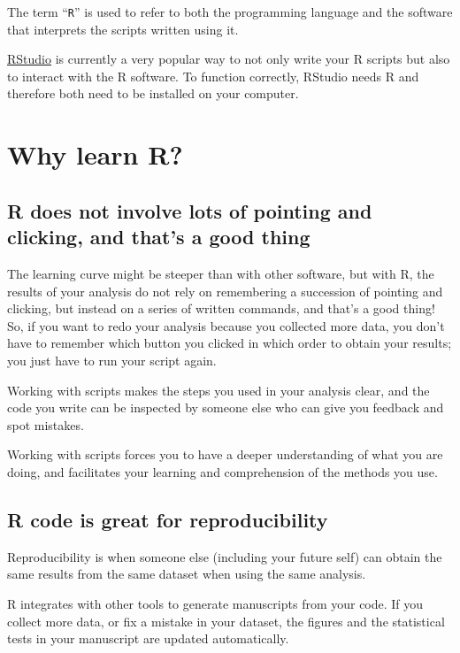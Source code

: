\documentclass[]{book}
\begin{document}
The term ``\texttt{R}'' is used to refer to both the programming
language and the software that interprets the scripts written using it.

\href{https://rstudio.com}{RStudio} is currently a very popular way to
not only write your R scripts but also to interact with the R software.
To function correctly, RStudio needs R and therefore both need to be
installed on your computer.

\section{Why learn R?}\label{why-learn-r}

\subsection{R does not involve lots of pointing and clicking, and that's
a good
thing}\label{r-does-not-involve-lots-of-pointing-and-clicking-and-thats-a-good-thing}

The learning curve might be steeper than with other software, but with
R, the results of your analysis do not rely on remembering a succession
of pointing and clicking, but instead on a series of written commands,
and that's a good thing! So, if you want to redo your analysis because
you collected more data, you don't have to remember which button you
clicked in which order to obtain your results; you just have to run your
script again.

Working with scripts makes the steps you used in your analysis clear,
and the code you write can be inspected by someone else who can give you
feedback and spot mistakes.

Working with scripts forces you to have a deeper understanding of what
you are doing, and facilitates your learning and comprehension of the
methods you use.

\subsection{R code is great for
reproducibility}\label{r-code-is-great-for-reproducibility}

Reproducibility is when someone else (including your future self) can
obtain the same results from the same dataset when using the same
analysis.

R integrates with other tools to generate manuscripts from your code. If
you collect more data, or fix a mistake in your dataset, the figures and
the statistical tests in your manuscript are updated automatically.
\end{document}
